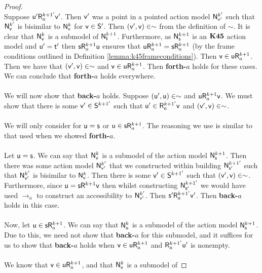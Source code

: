 \begin{proof}
	\\
	Suppose $\evu' \evR^{k+1'}_a \evv'$.
	Then $\evv'$ was a point in a pointed action model $\evM^{k'}_{\evv'}$ such that $\evM^{k'}_{\evv}$
	is bisimilar to $\evM^{k}_{\evv}$ for $\evv \in \evS'$.
	Then $(\evv',\evv) \in \sim$ from the definition of $\sim$.
	It is clear that $\evM^k_\evv$ is a submodel of $\evM^{k+1}_{\evt}$.
	Furthermore, as $\evM^{k+1}_\evs$ is an $\AXKFF$ action model and $\evu' = \evt'$ then $\evs
	\evR^{k+1}_a \evu$ ensures that $\evu \evR^{k+1}_a = \evs \evR^{k+1}_a$ (by the frame conditions
	outlined in Definition \ref{lemma:k45frameconditions}).
	Then $\evv \in \evu \evR^{k+1}_a$.
	Then we have that $(\evv',\evv) \in \sim$ and $\evv \in \evu \evR^{k+1}_a$.
	Then {\bf forth-$a$} holds for these cases.
	We can conclude that {\bf forth-$a$} holds everywhere.\\
	\\
	We will now show that {\bf back-$a$} holds.
	Suppose $(\evu',\evu) \in \sim$ and $\evu \evR^{k+1}_a \evv$.
	We must show that there is some $\evv' \in \evS^{k+1'}$ such that $\evu' \in \evR^{k+1'}_a \evv$ and
	$(\evv',\evv) \in \sim$.\\
	\\
	We will only consider for $\evu = \evs$ or $\evu \in \evs \evR^{k+1}_a$.
	The reasoning we use is similar to that used when we showed {\bf forth-$a$}.\\
	\\
	Let $\evu = \evs$.
	We can say that $\evM^{k}_\evv$ is a submodel of the action model $\evM^{k+1}_\evs$.
	Then there was some action model $\evM^{k'}_{\evv'}$ that we constructed within building
	$\evM^{k+1'}_{\evs'}$ such that $\evM^{k'}_{\evv'}$ is bisimilar to $\evM^k_\evv$.
	Then there is some $\evv' \in \evS^{k+1'}$ such that $(\evv',\evv) \in \sim$.
	Furthermore, since $\evu = \evs \evR^{k+1} \evv$ then whilst constructing $\evM^{k+1'}_{\evs'}$ we would
	have used $\to_a$ to construct an	accessibility to $\evM^{k'}_{\evv'}$.
	Then $\evs' \evR^{k+1'}_a \evv'$.
	Then {\bf back-$a$} holds in this case.\\
	\\
	Now, let $\evu \in \evs \evR^{k+1}_a$.
	We can say that $\evM^{k}_\evu$ is a submodel of the action model $\evM^{k+1}_\evs$.
	Due to this, we need not show that {\bf back-$a$} for this submodel, and it suffices for us to
	show that {\bf back-$a$} holds when $\evv \in \evu \evR^{k+1}_a$ and $\evR^{k+1'}_a \evu'$ is
	nonempty.\\
	\\
	We know that $\evv \in \evu \evR^{k+1}_a$, and that $\evM^{k}_\evv$ is a submodel of

\end{proof}
